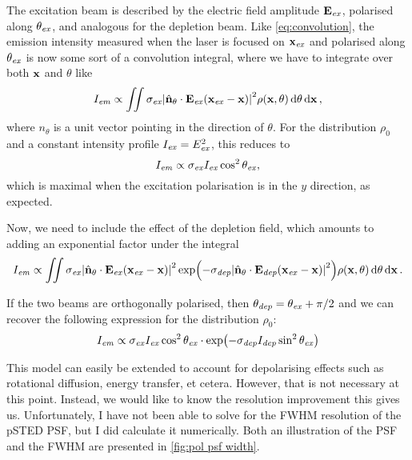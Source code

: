 The excitation beam is described by the electric field amplitude $ \vb{E}_{\mathit{ex}} $, polarised along $ \theta_{\mathit{ex}} $, and analogous for the depletion beam. Like \autoref{eq:convolution}, the emission intensity measured when the laser is focused on $ \vb{x}_{\mathit{ex}} $ and polarised along $ \theta_{\mathit{ex}} $ is now some sort of a convolution integral, where we have to integrate over both $ \vb{x} $ and $ \theta $ like
\begin{equation}
	I_{\mathit{em}} \propto \iint 
		\sigma_{\mathit{ex}} \abs{\hat{\vb{n}}_\theta\cdot \vb{E}_{\mathit{ex}}(\vb{x}_{\mathit{ex}}-\vb{x})}^2 
		\rho(\vb{x}, \theta) 
		\dd{\theta}\dd{\vb{x}} ,
\end{equation}
where $ \unit{n}_\theta $ is a unit vector pointing in the direction of $ \theta $. For the distribution $ \rho_0 $ and a constant intensity profile $ I_{\mathit{ex}} = E_{\mathit{ex}}^2 $, this reduces to
\begin{equation}
	I_{\mathit{em}} \propto \sigma_{\mathit{ex}} I_{\mathit{ex}} \cos^2\theta_{\mathit{ex}} ,
\end{equation}
which is maximal when the excitation polarisation is in the $ y $ direction, as expected.

Now, we need to include the effect of the depletion field, which amounts to adding an exponential factor under the integral
\begin{equation}
	I_{\mathit{em}} \propto \iint
		\sigma_{\mathit{ex}} \abs{\hat{\vb{n}}_\theta\cdot \vb{E}_{\mathit{ex}}(\vb{x}_{\mathit{ex}}-\vb{x})}^2 
		\exp(-\sigma_{\mathit{dep}} \abs{\hat{\vb{n}}_\theta\cdot \vb{E}_{\mathit{dep}}(\vb{x}_{\mathit{ex}}-\vb{x})}^2)
		\rho(\vb{x}, \theta) 
		\dd{\theta}\dd{\vb{x}}.
	\label{eq:psted integral}
\end{equation}

If the two beams are orthogonally polarised, then $ \theta_{\mathit{dep}} = \theta_{\mathit{ex}} + \pi/2 $ and we can recover the following expression for the distribution $ \rho_0 $:
\begin{equation}
	I_{\mathit{em}} \propto 
		\sigma_{\mathit{ex}} I_{\mathit{ex}} \cos^2 \theta_{\mathit{ex}}\cdot
		\exp(-\sigma_{\mathit{dep}} I_{\mathit{dep}} \sin^2 \theta_{\mathit{ex}})
	\label{eq:pol psf}
\end{equation}

This model can easily be extended to account for depolarising effects such as rotational diffusion, energy transfer, et cetera. However, that is not necessary at this point. Instead, we would like to know the resolution improvement this gives us. Unfortunately, I have not been able to solve for the FWHM resolution of the pSTED PSF, but I did calculate it numerically. Both an illustration of the PSF and the FWHM are presented in \autoref{fig:pol psf width}.

